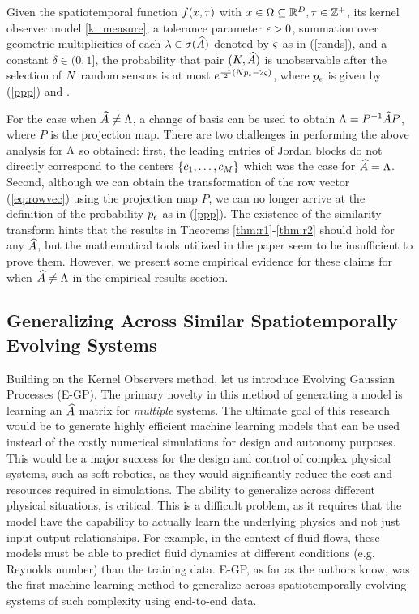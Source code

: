 \begin{theorem}\label{thm:r2}
	Given the spatiotemporal function $ f(x,\tau) $ with $ x \in \Omega \subseteq  \mathbb{R}^{D}, \tau\in \mathbb{Z}^+  $, its kernel observer model \eqref{k_measure}, a tolerance parameter $\epsilon>0$, summation over geometric multiplicities of each $ \lambda \in \sigma(\widehat{A}) $ denoted by $ \varsigma  $ as in  (\ref{rands}), and a constant $ \delta \in (0,1] $, the probability that pair $ (K, \widehat{A}) $ is unobservable after the selection of $ N $ random sensors is at most $ e^{\frac{-1}{2}(N p_{\epsilon}-2\varsigma)} $, where $ p_{\epsilon} $ is given by (\ref{ppp}) and .
\end{theorem}
For the case when $ \widehat{A} \neq \Lambda $, a change of basis can be used to obtain $ \Lambda = P^{-1}\widehat{A} P $, where $ P $ is the projection map. There are two challenges in performing the above analysis for $\Lambda$ so obtained: first, the leading entries of Jordan blocks do not directly correspond to the centers $\{ c_1,\dots,c_M\}$ which was the case for $ \widehat{A} = \Lambda $. Second, although we can obtain the transformation of the row vector (\ref{eq:rowvec}) using the projection map $P$, we can no longer arrive at the definition of the probability $p_{\epsilon}$ as in  (\ref{ppp}). The existence of the similarity transform hints that the results in Theorems \ref{thm:r1}-\ref{thm:r2} should hold for any $ \widehat{A}$, but the mathematical tools utilized in the paper seem to be insufficient to prove them. However, we present some empirical evidence for these claims for when $ \widehat{A} \neq \Lambda $  in the empirical results section.%


\subsection{Generalizing Across Similar Spatiotemporally Evolving Systems} \label{sec:egp}
Building on the Kernel Observers method, let us introduce Evolving Gaussian Processes (E-GP). The primary novelty in this method of generating a model is learning an $\widehat{A}$ matrix for \emph{multiple} systems. The ultimate goal of this research would be to generate highly efficient machine learning models that can be used instead of the costly numerical simulations for design and autonomy purposes. This would be a major success for the design and control of complex physical systems, such as soft robotics, as they would significantly reduce the cost and resources required in simulations. The ability to generalize across different physical situations, is critical. This is a difficult problem, as it requires that the model have the capability to actually learn the underlying physics and not just input-output relationships. For example, in the context of fluid flows, these models must be able to predict fluid dynamics at different conditions (e.g. Reynolds number) than the training data. E-GP, as far as the authors know, was the first machine learning method to generalize across spatiotemporally evolving systems of such complexity using end-to-end data.

